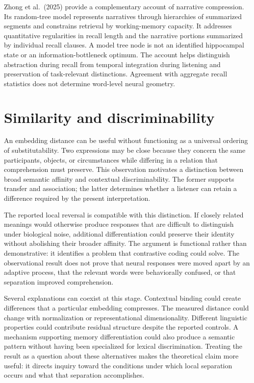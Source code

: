 \documentclass[11pt]{article}
\begin{document}
Zhong et al.~(2025) provide a complementary account of narrative
compression. Its random-tree model represents narratives through
hierarchies of summarized segments and constrains retrieval by
working-memory capacity. It addresses quantitative regularities in
recall length and the narrative portions summarized by individual recall
clauses. A model tree node is not an identified hippocampal state or an
information-bottleneck optimum. The account helps distinguish
abstraction during recall from temporal integration during listening and
preservation of task-relevant distinctions. Agreement with aggregate
recall statistics does not determine word-level neural geometry.

\hypertarget{similarity-and-discriminability}{%
\section{Similarity and
discriminability}\label{similarity-and-discriminability}}

An embedding distance can be useful without functioning as a universal
ordering of substitutability. Two expressions may be close because they
concern the same participants, objects, or circumstances while differing
in a relation that comprehension must preserve. This observation
motivates a distinction between broad semantic affinity and contextual
discriminability. The former supports transfer and association; the
latter determines whether a listener can retain a difference required by
the present interpretation.

The reported local reversal is compatible with this distinction. If
closely related meanings would otherwise produce responses that are
difficult to distinguish under biological noise, additional
differentiation could preserve their identity without abolishing their
broader affinity. The argument is functional rather than demonstrative:
it identifies a problem that contrastive coding could solve. The
observational result does not prove that neural responses were moved
apart by an adaptive process, that the relevant words were behaviorally
confused, or that separation improved comprehension.

Several explanations can coexist at this stage. Contextual binding could
create differences that a particular embedding compresses. The measured
distance could change with normalization or representational
dimensionality. Different linguistic properties could contribute
residual structure despite the reported controls. A mechanism supporting
memory differentiation could also produce a semantic pattern without
having been specialized for lexical discrimination. Treating the result
as a question about these alternatives makes the theoretical claim more
useful: it directs inquiry toward the conditions under which local
separation occurs and what that separation accomplishes.
\end{document}

